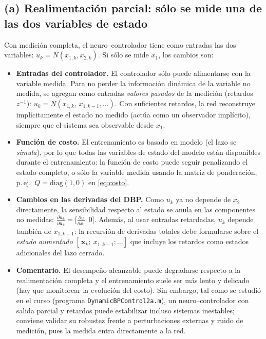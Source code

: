 \documentclass[11pt,a4paper]{article}
\newcommand{\pd}[2]{\frac{\partial #1}{\partial #2}}
\begin{document}
\subsection*{(a) Realimentación parcial: sólo se mide una de las dos variables de estado}

Con medición completa, el neuro--controlador tiene como entradas las dos variables: $u_k=N(x_{1,k},x_{2,k})$. Si sólo se mide $x_1$, los cambios son:

\begin{itemize}[itemsep=2pt]
\item \textbf{Entradas del controlador.} El controlador sólo puede alimentarse con la variable medida. Para no perder la información dinámica de la variable no medida, se agregan como entradas \emph{valores pasados} de la medición (retardos $z^{-1}$): $u_k=N(x_{1,k},\,x_{1,k-1},\dots)$. Con suficientes retardos, la red reconstruye implícitamente el estado no medido (actúa como un observador implícito), siempre que el sistema sea observable desde $x_1$.
\item \textbf{Función de costo.} El entrenamiento es basado en modelo (el lazo se \emph{simula}), por lo que todas las variables de estado del modelo están disponibles durante el entrenamiento: la función de costo puede seguir penalizando el estado completo, o sólo la variable medida usando la matriz de ponderación, p.\,ej.\ $Q=\mathrm{diag}(1,0)$ en \eqref{eq:costo}.
\item \textbf{Cambios en las derivadas del DBP.} Como $u_k$ ya no depende de $x_2$ directamente, la sensibilidad respecto al estado se anula en las componentes no medidas: $\pd{u_k}{\mathbf x_k}=\bigl[\pd{u}{x_1}\ \ 0\bigr]$. Además, al usar entradas retardadas, $u_k$ depende también de $x_{1,k-1}$: la recursión de derivadas totales debe formularse sobre el \emph{estado aumentado} $[\,\mathbf x_k;\ x_{1,k-1};\dots]$ que incluye los retardos como estados adicionales del lazo cerrado.
\item \textbf{Comentario.} El desempeño alcanzable puede degradarse respecto a la realimentación completa y el entrenamiento suele ser más lento y delicado (hay que monitorear la evolución del costo). Sin embargo, tal como se estudió en el curso (programa \texttt{DynamicBPControl2a.m}), un neuro--controlador con salida parcial y retardos puede estabilizar incluso sistemas inestables; conviene validar su robustez frente a perturbaciones externas y ruido de medición, pues la medida entra directamente a la red.
\end{itemize}
\end{document}

